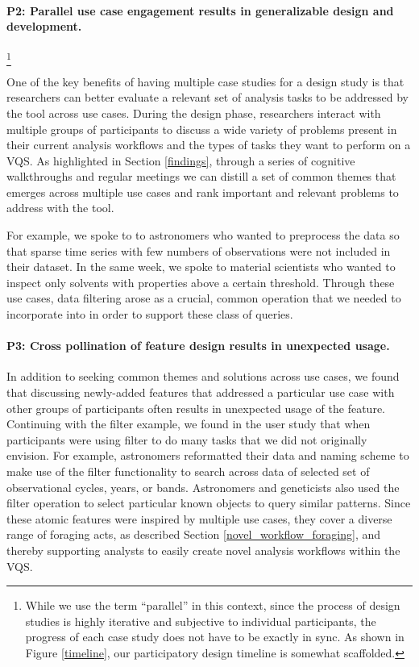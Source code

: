 {\paragraph{P2: Parallel use case engagement results in generalizable design and development.}\footnote{While we use the term ``parallel'' in this context, since the process of design studies is highly iterative and subjective to individual participants, the progress of each case study does not have to be exactly in sync. As shown in Figure \ref{timeline}, our participatory design timeline is somewhat scaffolded.} 
\par One of the key benefits of having multiple case studies for a design study is that researchers can better evaluate a relevant set of analysis tasks to be addressed by the tool across use cases. During the design phase, researchers interact with multiple groups of participants to discuss a wide variety of problems present in their current analysis workflows and the types of tasks they want to perform on a VQS. As highlighted in Section \ref{findings}, through a series of cognitive walkthroughs and regular meetings we can distill a set of common themes that emerges across multiple use cases and rank important and relevant problems to address with the tool.
\par For example, we spoke to to astronomers who wanted to preprocess the data so that sparse time series with few numbers of observations were not included in their dataset. In the same week, we spoke to material scientists who wanted to inspect only solvents with properties above a certain threshold. Through these use cases, data filtering arose as a crucial, common operation that we needed to incorporate into \zv in order to support these class of queries.
\paragraph{P3: Cross pollination of feature design results in unexpected usage.}
In addition to seeking common themes and solutions across use cases, we found that discussing newly-added features that addressed a particular use case with other groups of participants often results in unexpected usage of the feature. Continuing with the filter example, we found in the user study that when participants were using filter to do many tasks that we did not originally envision. For example, astronomers reformatted their data and naming scheme to make use of the filter functionality to search across data of selected set of observational cycles, years, or bands. Astronomers and geneticists also used the filter operation to select particular known objects to query similar patterns. Since these atomic features were inspired by multiple use cases, they cover a diverse range of foraging acts, as described Section \ref{novel_workflow_foraging}, and thereby supporting analysts to easily create novel analysis workflows within the VQS.
}
